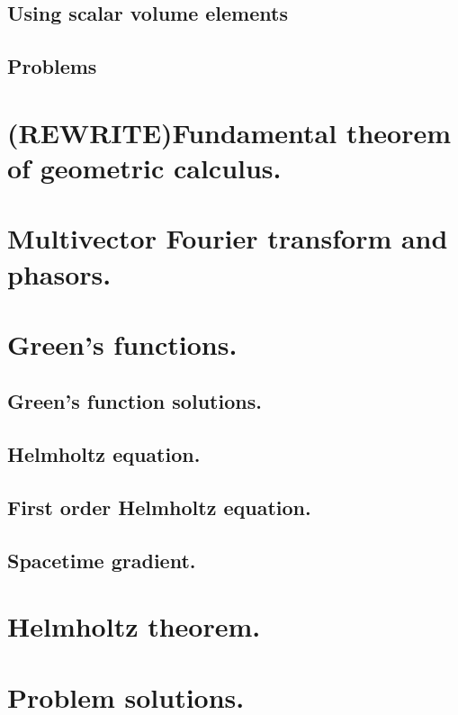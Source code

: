       \subsection{Using scalar volume elements}
         
      \subsection{Problems}
         
         
   \section{(REWRITE)Fundamental theorem of geometric calculus.}
      
   \section{Multivector Fourier transform and phasors.}
      
   \section{Green's functions.}
      
      \subsection{Green's function solutions.}
         
      \subsection{Helmholtz equation.}
         
      \subsection{First order Helmholtz equation.}
         
      \subsection{Spacetime gradient.}
         
   \section{Helmholtz theorem.}
      
      
   \section{Problem solutions.}
      \shipoutAnswer
